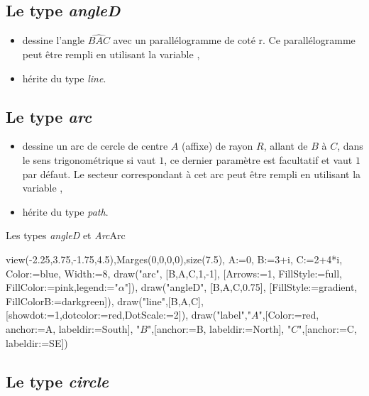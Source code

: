 \subsection{Le type \emph{angleD}}

{\centering {}\par}

\begin{itemize}
 \item\desc dessine l'angle $\widehat{BAC}$ avec un parallélogramme de coté r. Ce parallélogramme peut être rempli en utilisant la variable ,
 \item hérite du type \emph{line}.
\end{itemize}

\subsection{Le type \emph{arc}}\label{typearc}

{\centering {}\par}

\begin{itemize}
 \item\desc dessine un arc de cercle de centre $A$ (affixe) de rayon $R$, allant de $B$ à $C$, dans le sens trigonométrique si  vaut $1$, ce dernier paramètre est facultatif et vaut $1$ par défaut. Le secteur correspondant à cet arc peut être rempli en utilisant la variable ,
 \item hérite du type \emph{path}.
\end{itemize}

\begin{demo}{Les types \emph{angleD} et \emph{Arc}}{Arc}
\begin{texgraph}[name=Arc]
view(-2.25,3.75,-1.75,4.5),Marges(0,0,0,0),size(7.5),
A:=0, B:=3+i, C:=2+4*i, Color:=blue, Width:=8,
draw("arc", [B,A,C,1,-1], [Arrows:=1, FillStyle:=full,
 FillColor:=pink,legend:="$\alpha$"]),
draw("angleD", [B,A,C,0.75], [FillStyle:=gradient,
 FillColorB:=darkgreen]),
draw("line",[B,A,C],[showdot:=1,dotcolor:=red,DotScale:=2]),
draw("label","$A$",[Color:=red, anchor:=A, labeldir:=South],
       "$B$",[anchor:=B, labeldir:=North],
       "$C$",[anchor:=C, labeldir:=SE])
\end{texgraph}
\end{demo}

\subsection{Le type \emph{circle}}

